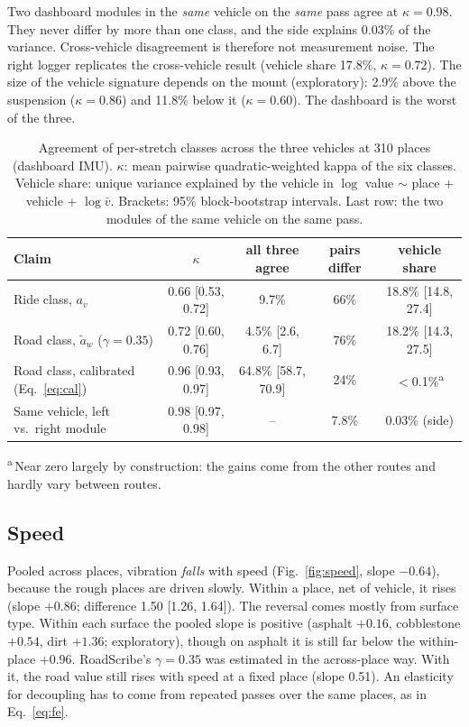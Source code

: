Two dashboard modules in the \emph{same} vehicle on the \emph{same} pass agree at $\kappa=0.98$. They never differ by more than one class, and the side explains 0.03\% of the variance. Cross-vehicle disagreement is therefore not measurement noise.
The right logger replicates the cross-vehicle result (vehicle share 17.8\%, $\kappa=0.72$).
The size of the vehicle signature depends on the mount (exploratory): 2.9\% above the suspension ($\kappa=0.86$) and 11.8\% below it ($\kappa=0.60$). The dashboard is the worst of the three.

\begin{table}[t]
\caption{Agreement of per-stretch classes across the three vehicles at 310 places (dashboard IMU). $\kappa$: mean pairwise quadratic-weighted kappa of the six classes. Vehicle share: unique variance explained by the vehicle in $\log$ value $\sim$ place + vehicle + $\log\bar v$. Brackets: 95\% block-bootstrap intervals. Last row: the two modules of the same vehicle on the same pass.}
\label{tab:invariance}
\centering
\footnotesize
\setlength{\tabcolsep}{6pt}
\begin{tabular}{@{}lcccc@{}}
\toprule
Claim & $\kappa$ & all three agree & pairs differ & vehicle share \\
\midrule
Ride class, $a_v$ & 0.66 [0.53, 0.72] & 9.7\% & 66\% & 18.8\% [14.8, 27.4] \\
Road class, $\tilde a_w$ ($\gamma=0.35$) & 0.72 [0.60, 0.76] & 4.5\% [2.6, 6.7] & 76\% & 18.2\% [14.3, 27.5] \\
Road class, calibrated (Eq.~\ref{eq:cal}) & 0.96 [0.93, 0.97] & 64.8\% [58.7, 70.9] & 24\% & $<$0.1\%\textsuperscript{a} \\
\midrule
Same vehicle, left vs.\ right module & 0.98 [0.97, 0.98] & -- & 7.8\% & 0.03\% (side) \\
\bottomrule
\end{tabular}

\smallskip
{\scriptsize\textsuperscript{a}\,Near zero largely by construction: the gains come from the other routes and hardly vary between routes.}
\end{table}

\subsection{Speed}
\label{sec:speed}
Pooled across places, vibration \emph{falls} with speed (Fig.~\ref{fig:speed}, slope $-0.64$), because the rough places are driven slowly.
Within a place, net of vehicle, it rises (slope $+0.86$; difference 1.50 [1.26, 1.64]).
The reversal comes mostly from surface type. Within each surface the pooled slope is positive (asphalt $+0.16$, cobblestone $+0.54$, dirt $+1.36$; exploratory), though on asphalt it is still far below the within-place $+0.96$.
RoadScribe's $\gamma=0.35$ was estimated in the across-place way. With it, the road value still rises with speed at a fixed place (slope 0.51).
An elasticity for decoupling has to come from repeated passes over the same places, as in Eq.~\eqref{eq:fe}.

